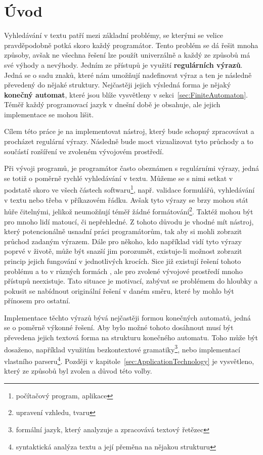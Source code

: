 \chapter{Úvod}\label{sec:Introduction}

Vyhledávání v textu patří mezi základní problémy, se kterými se velice pravděpodobně potká skoro každý programátor. 
Tento problém se dá řešit mnoha způsoby, avšak ne všechna řešení lze použít univerzálně a každý ze způsobů má své výhody a nevýhody.
Jedním ze přístupů je využití \textbf{regulárních výrazů}. 
Jedná se o sadu znaků, které nám umožňují nadefinovat výraz a ten je následně převedený do nějaké struktury. 
Nejčastěji jejich výsledná forma je nějaký \textbf{konečný automat}, které jsou blíže vysvětleny v sekci~\ref{sec:FiniteAutomaton}.
Téměř každý programovací jazyk v dnešní době je obsahuje, ale jejich implementace se mohou lišit.

Cílem této práce je na implementovat nástroj, který bude schopný zpracovávat a procházet regulární výrazy. 
Následně bude moct vizualizovat tyto průchody a to součástí rozšíření ve zvoleném vývojovém prostředí.

Při vývoji programů, je programátor často obeznámen s regulárními výrazy, jedná se totiž o poměrně rychlé vyhledávání v textu. 
Můžeme se s nimi setkat v podstatě skoro ve všech částech softwaru\footnote{počítačový program, aplikace}, např. validace formulářů, vyhledávání v textu nebo třeba v příkazovém řádku.
Avšak tyto výrazy se brzy mohou stát hůře čitelnými, jelikož neumožňují téměř žádné formátování\footnote{upravení vzhledu, tvaru}. 
Taktéž mohou být pro mnoho lidí matoucí, či nepřehledné.
Z tohoto důvodu je vhodné mít nástroj, který potencionálně usnadní práci programátorům, tak aby si mohli zobrazit průchod zadaným výrazem.
Dále pro někoho, kdo například vidí tyto výrazy poprvé v životě, může být snazší jim porozumět, existuje-li možnost zobrazit princip jejich fungování v jednotlivých krocích.
Sice již existují řešení tohoto problému a to v různých formách \cite{Dib, Regexper, RegExr}, ale pro zvolené vývojové prostředí mnoho přístupů neexistuje.
Tato situace je motivací, zabývat se problémem do hloubky a pokusit se nabídnout originální řešení v daném směru, které by mohlo být přínosem pro ostatní.

Implementace těchto výrazů bývá nejčastěji formou konečných automatů, jedná se o poměrně výkonné řešení. 
Aby bylo možné tohoto dosáhnout musí být převedena jejich textová forma na strukturu konečného automatu.
Toho může být dosaženo, například využitím bezkontextové gramatiky\footnote{formální jazyk, který analyzuje a zpracovává textový řetězec}, nebo implementací vlastního parseru\footnote{syntaktická analýza textu a její přeměna na nějakou strukturu}.
Později v kapitole~\ref{sec:ApplicationTechnology} je vysvětleno, který ze způsobů byl zvolen a důvod této volby.

